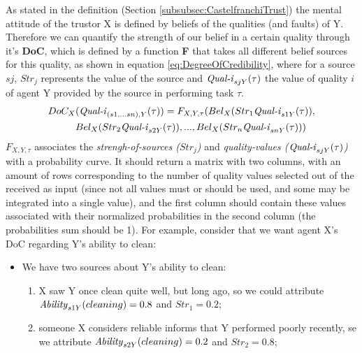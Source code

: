 As stated in the definition (Section \ref{subsubsec:CastelfranchiTrust}) the mental attitude of the trustor X is defined by beliefs of the qualities (and faults) of Y. Therefore we can quantify the strength of our belief in a certain quality through it's \textbf{\ac{DoC}}, which is defined by a function \textbf{F} that takes all different belief sources for this quality, as shown in equation \ref{eq:DegreeOfCredibility}, where for a source $sj$, $Str_j$ represents the value of the source and $\text{\textit{Qual-i}}_{sjY}(\tau)$ the value of quality $i$ of agent Y provided by the source in performing task $\tau$. 
\begin{equation}
	\begin {aligned}
	DoC_X&(\text{\textit{Qual-i}}_{(s1, ...sn), Y} (\tau)) = F_{X, Y, \tau} (Bel_X(Str_1 \text{\textit{Qual-i}}_{s1Y}(\tau)), \\
		 &Bel_X(Str_2 \text{\textit{Qual-i}}_{s2Y}(\tau)), ..., Bel_X(Str_n \text{\textit{Qual-i}}_{snY}(\tau))) \\
	\end {aligned}
	\label{eq:DegreeOfCredibility}
\end{equation}
$F_{X, Y, \tau}$ associates the \textit{strengh-of-sources ($Str_j$)} and \textit{quality-values ($\text{\textit{Qual-i}}_{sjY}(\tau)$)} with a probability curve. It should return a matrix with two columns, with an amount of rows corresponding to the number of quality values selected out of the received as input (since not all values must or should be used, and some may be integrated into a single value), and the first column should contain these values associated with their normalized probabilities in the second column (the probabilities sum should be 1). For example, consider that we want agent X's \ac{DoC} regarding Y's ability to clean:
\begin{itemize}
	\item We have two sources about Y's ability to clean:
	\begin{enumerate}
		\item X saw Y once clean quite well, but long ago, so we could attribute $\text{\textit{Ability}}_{s1Y}(cleaning) = 0.8$ and $Str_1=0.2$;
		\item someone X considers reliable informs that Y performed poorly recently, se we attribute
		$\text{\textit{Ability}}_{s2Y}(cleaning) = 0.2$ and $Str_2=0.8$;
	\end{enumerate}
\end{itemize} 
	



